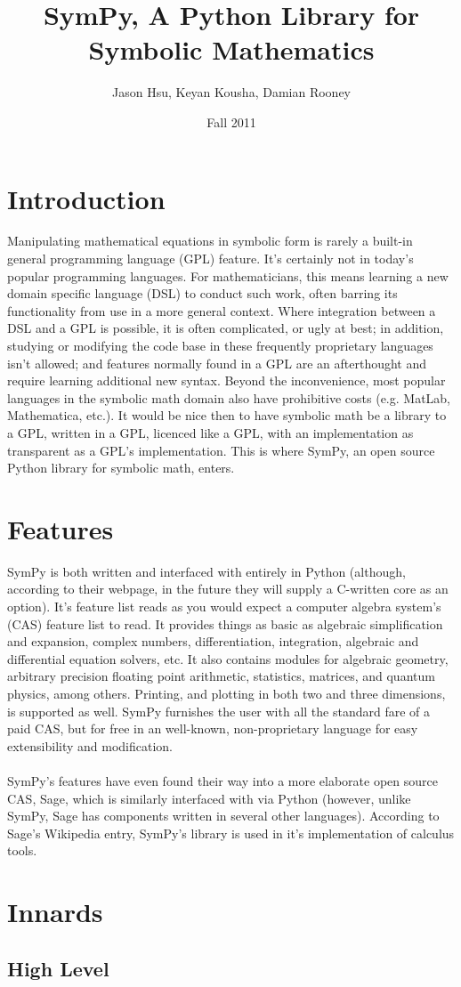 \documentclass[11pt,a4paper,oneside]{report}
\begin{document}
\title{SymPy, A Python Library for Symbolic Mathematics}
\author{Jason Hsu, Keyan Kousha, Damian Rooney}
\date{Fall 2011}
\maketitle
\section*{Introduction}
Manipulating mathematical equations in symbolic form is rarely a built-in general programming language (GPL) feature. It's certainly not in today's popular programming languages. For mathematicians, this means learning a new domain specific language (DSL) to conduct such work, often barring its functionality from use in a more general context. Where integration between a DSL and a GPL is possible, it is often complicated, or ugly at best; in addition, studying or modifying the code base in these frequently proprietary languages isn't allowed; and features normally found in a GPL are an afterthought and require learning additional new syntax. Beyond the inconvenience, most popular languages in the symbolic math domain also have prohibitive costs (e.g. MatLab, Mathematica, etc.). It would be nice then to have symbolic math be a library to a GPL, written in a GPL, licenced like a GPL, with an implementation as transparent as a GPL's implementation. This is where SymPy, an open source Python library for symbolic math, enters.
\section*{Features}
SymPy is both written and interfaced with entirely in Python (although, according to their webpage, in the future they will supply a C-written core as an option). It's feature list reads as you would expect a computer algebra system's (CAS) feature list to read. It provides things as basic as algebraic simplification and expansion, complex numbers, differentiation, integration, algebraic and differential equation solvers, etc. It also contains modules for algebraic geometry, arbitrary precision floating point arithmetic, statistics, matrices, and quantum physics, among others. Printing, and plotting in both two and three dimensions, is supported as well. SymPy furnishes the user with all the standard fare of a paid CAS, but for free in an well-known, non-proprietary language for easy extensibility and modification.\\\\
 SymPy's features have even found their way into a more elaborate open source CAS, Sage, which is similarly interfaced with via Python (however, unlike SymPy, Sage has components written in several other languages). According to Sage's Wikipedia entry, SymPy's library is used in it's implementation of calculus tools.
 \section*{Innards}
 \subsection*{\small High Level}
\end{document}
